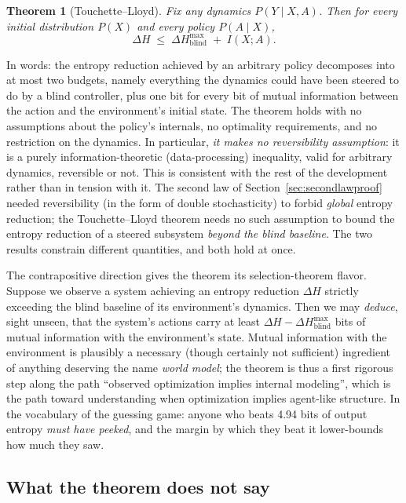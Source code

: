 \documentclass[10pt]{article}
\newtheorem{theorem}{Theorem}[section]
\theoremstyle{definition}
\theoremstyle{remark}
\begin{document}
\begin{theorem}[Touchette--Lloyd]
\label{thm:tl}
Fix any dynamics $P(Y \mid X, A)$. Then for every initial distribution $P(X)$ and every policy $P(A \mid X)$,
\[
\Delta H \;\le\; \Delta H^{\max}_{\mathrm{blind}} \;+\; I(X; A).
\]
\end{theorem}

In words: the entropy reduction achieved by an arbitrary policy decomposes into at most two budgets, namely everything the dynamics could have been steered to do by a blind controller, plus one bit for every bit of mutual information between the action and the environment's initial state. The theorem holds with no assumptions about the policy's internals, no optimality requirements, and no restriction on the dynamics. In particular, \emph{it makes no reversibility assumption}: it is a purely information-theoretic (data-processing) inequality, valid for arbitrary dynamics, reversible or not. This is consistent with the rest of the development rather than in tension with it. The second law of Section~\ref{sec:secondlawproof} needed reversibility (in the form of double stochasticity) to forbid \emph{global} entropy reduction; the Touchette--Lloyd theorem needs no such assumption to bound the entropy reduction of a steered subsystem \emph{beyond the blind baseline}. The two results constrain different quantities, and both hold at once.

The contrapositive direction gives the theorem its selection-theorem flavor. Suppose we observe a system achieving an entropy reduction $\Delta H$ strictly exceeding the blind baseline of its environment's dynamics. Then we may \emph{deduce}, sight unseen, that the system's actions carry at least $\Delta H - \Delta H^{\max}_{\text{blind}}$ bits of mutual information with the environment's state. Mutual information with the environment is plausibly a necessary (though certainly not sufficient) ingredient of anything deserving the name \emph{world model}; the theorem is thus a first rigorous step along the path ``observed optimization implies internal modeling'', which is the path toward understanding when optimization implies agent-like structure. In the vocabulary of the guessing game: anyone who beats 4.94 bits of output entropy \emph{must have peeked}, and the margin by which they beat it lower-bounds how much they saw.

\subsection{What the theorem does not say}
\label{sec:tlcaveats}
\end{document}

